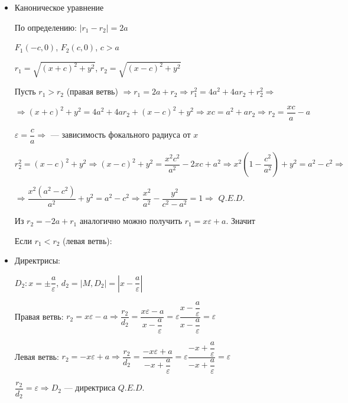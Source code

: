 \documentclass[twoside]{book}
\begin{document}
\begin{itemize}
    \item Каноническое уравнение

          По определению: \(|r_1 - r_2| = 2a\)

          \(F_1(-c, 0)\), \(F_2(c, 0)\), \(c > a\)

          \(r_1 = \sqrt{(x + c)^2 + y^2}\), \(r_2 = \sqrt{(x - c)^2 + y^2}\)

          Пусть \(r_1 > r_2\) (правая ветвь) \(\Rightarrow r_1 = 2a + r_2 \Rightarrow r_1^2 = 4a^2 + 4ar_2 + r_2^2 \Rightarrow\)

          \(\Rightarrow (x + c)^2 + y^2 = 4a^2 + 4ar_2 + (x - c)^2 + y^2 \Rightarrow xc = a^2 + ar_2 \Rightarrow r_2 = \dfrac{xc}{a} - a\)

          \(\varepsilon = \dfrac{c}{a} \Rightarrow\)  --- зависимость фокального радиуса от \(x\)

          \(r_2^2 = (x - c)^2 + y^2 \Rightarrow (x - c)^2 + y^2 = \dfrac{x^2 c^2}{a^2} - 2xc + a^2 \Rightarrow x^2\left(1 - \dfrac{c^2}{a^2}\right) + y^2 = a^2 - c^2 \Rightarrow\)

          \(\Rightarrow \dfrac{x^2(a^2 - c^2)}{a^2} + y^2 = a^2 - c^2 \Rightarrow \dfrac{x^2}{a^2} - \dfrac{y^2}{c^2 - a^2} = 1 \Rightarrow\)  \(Q.E.D.\)

          Из \(r_2 = -2a + r_1\) аналогично можно получить \(r_1 = x \varepsilon + a\). Значит 

          Если \(r_1 < r_2\) (левая ветвь): 

    \item Директрисы:

          \(D_2: x = \pm \dfrac{a}{\varepsilon}\), \(d_2 = |M, D_2| = \left|x - \dfrac{a}{\varepsilon}\right|\)

          Правая ветвь: \(r_2 = x \varepsilon - a \Rightarrow \dfrac{r_2}{d_2} = \dfrac{x \varepsilon - a}{x - \dfrac{a}{\varepsilon}} = \varepsilon \dfrac{x - \dfrac{a}{\varepsilon}}{x - \dfrac{a}{\varepsilon}} = \varepsilon\)

          Левая ветвь: \(r_2 = -x \varepsilon + a \Rightarrow \dfrac{r_2}{d_2} = \dfrac{-x \varepsilon + a}{-x + \dfrac{a}{\varepsilon}} = \varepsilon \dfrac{-x + \dfrac{a}{\varepsilon}}{-x + \dfrac{a}{\varepsilon}} = \varepsilon\)

          \(\dfrac{r_2}{d_2} = \varepsilon \Rightarrow D_2\) --- директриса \(Q.E.D.\)


\end{itemize}
\end{document}
